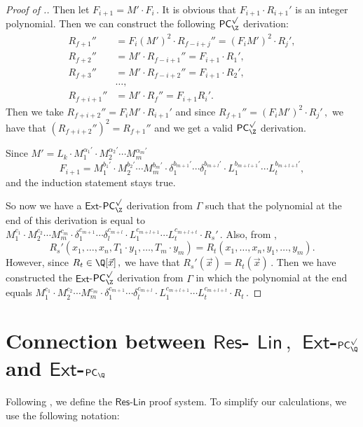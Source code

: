 \documentclass{toc}
\begin{document}
\begin{proof}[Proof of .]
%
Then let %
$F_{i + 1} = M' \cdot F_i\,.$ %
 It is obvious that $F_{i + 1} \cdot R_{i + 1}'$ is an integer polynomial. Then we can construct the following $\mathsf{PC}_{\Z}^{\surd}$ derivation: %
\begin{align*}
    R_{f + 1}'' &= F_i (M')^2 \cdot R_{f - i + j}'' =  (F_i M')^2 \cdot R_j', \\  R_{f + 2}'' &= M' \cdot R_{f - i + 1}'' = F_{i + 1} \cdot R_1', \\  R_{f + 3}'' &= M' \cdot R_{f - i + 2}'' = F_{i + 1} \cdot R_2', \\ &\ldots, \\ R_{f + i + 1}'' &= M' \cdot R_{f}'' = F_{i + 1} R_{i}'.
\end{align*}
Then we take $R_{f + i + 2}'' = F_i M' \cdot R_{i + 1}'$ and since %
$R_{f + 1}'' = (F_i M')^2 \cdot R_j'\,,$ %
 we have that $(R_{f + i + 2}'')^2 = R_{f + 1}''$ and we get a valid $\mathsf{PC}_{\Z}^{\surd}$ derivation.

%
Since  $M' = L_k \cdot M_1^{\alpha_1'} \cdot M_2^{\alpha_2'} \cdots M_m^{\alpha_m'}$ %
$$
%
F_{i + 1} = M_1^{b_1'} \cdot M_2^{b_2'} \cdots M_m^{b_m'} \cdot \delta_1^{b_{m + 1}'} \cdots \delta_l^{b_{m + l}'} \cdot  L_1^{b_{m + l + 1}'} \cdots L_t^{b_{m + l + t}'}, %
$$
and the induction statement stays true.




So now we have a $\mathsf{Ext}$-$\mathsf{PC}^{\surd}_{\Z}$ derivation from $\Gamma$ such that the polynomial at %
the end of this derivation is equal to %
$M_1^{c_1} \cdot M_2^{c_2} \cdots M_m^{c_m} \cdot \delta_1^{c_{m + 1}} \cdots \delta_l^{c_{m + l}} \cdot  L_1^{c_{m + l + 1}} \cdots L_t^{c_{m + l + t}}  \cdot R_s'\,.$ %
 Also, from  ,
$$
    R_s'(x_1, \ldots, x_n, T_1 \cdot y_1, \ldots, T_m \cdot y_m) = R_t(x_1, \ldots, x_n, y_1, \ldots, y_m).
$$
    However, since %
$R_t \in \Q[\vec x]\,,$ %
 we have that %
$R_s'(\vec x) = R_t(\vec x)\,.$ %
 Then we have constructed the $\mathsf{Ext}$-$\mathsf{PC}^{\surd}_{\Z}$ derivation from $\Gamma$ in which the polynomial at %
%
the end equals  %
$M_1^{c_1} \cdot M_2^{c_2} \cdots M_m^{c_m} \cdot \delta_1^{c_{m + 1}} \cdots \delta_l^{c_{m + l}} \cdot  L_1^{c_{m + l + 1}} \cdots L_t^{c_{m + l + t}}  \cdot R_t\,.$ %
%
\end{proof}

\section{Connection between \texorpdfstring{$\mathsf{Res}$-%
$\mathsf{Lin}\,,$ %
 $\mathsf{Ext}$-$\mathsf{PC}_{\Q}^{\surd}$ and $\mathsf{Ext}$-$\mathsf{PC}_{\Q}$}{Res-Lin, Ext-PC-Q-sqrt and Ext-PC-Q}}
\label{section-4}
Following \cite{RT07}, we define the $\mathsf{Res}$-$\mathsf{Lin}$ proof system. To simplify our calculations, we use the following notation:
\end{document}
